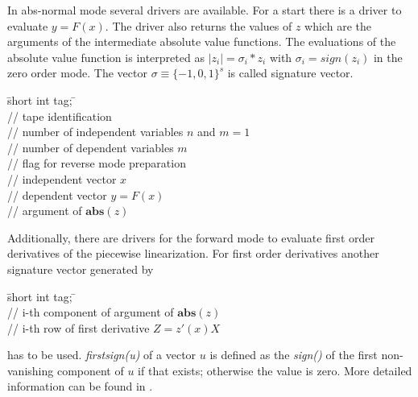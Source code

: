 In abs-normal mode several drivers are available. For a start there is a driver 
to evaluate $y=F(x)$. The driver also returns the values of $z$ which are the arguments 
of the intermediate absolute value functions. The evaluations of the absolute value 
function is interpreted as $|z_i|=\sigma_i*z_i$ with $\sigma_i=sign(z_i)$ in the zero 
order mode. The vector $\sigma\equiv \{-1,0,1\}^s$ is called signature vector.

\begin{tabbing}
\hspace{0.5in}\={\sf short int tag;} \hspace{1.1in}\= \kill    %
\\
         \> // tape identification \\
                 \> // number of independent variables $n$ and $m=1$\\
                 \> // number of dependent variables $m$\\
              \> // flag for reverse mode preparation\\
           \> // independent vector $x$ \\
           \> // dependent vector $y=F(x)$ \\
           \> // argument of $\mathbf{abs}(z)$ 
\end{tabbing}
%
Additionally, there are drivers for the forward mode to evaluate first order 
derivatives of the piecewise linearization. For first order derivatives another 
signature vector generated by 
\begin{tabbing}
\hspace{0.5in}\={\sf short int tag;} \hspace{1.1in}\= \kill    %
\\
          \> // i-th component of argument of $\mathbf{abs}(z)$ \\
          \> // i-th row of first derivative $Z=z\prime (x)X$
\end{tabbing}
has to be used. \textit{firstsign(u)} of a vector $u$ is defined as the \textit{sign()} 
of the first non-vanishing component of $u$ if that exists; otherwise the value is zero. 
More detailed information can be found in \cite{Griewank13}. 

